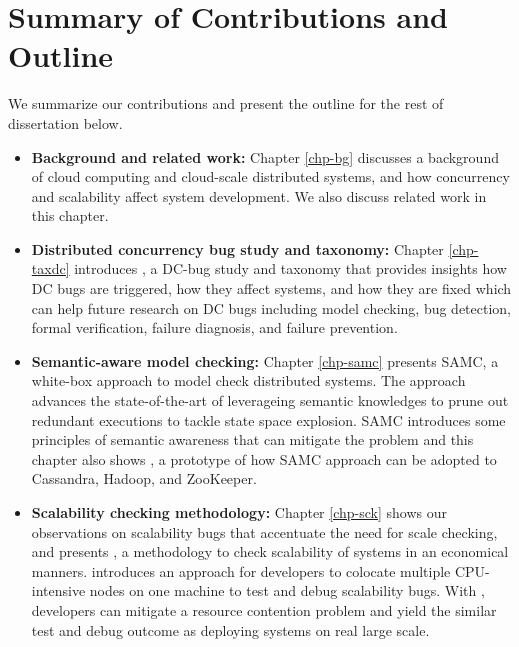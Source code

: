 \section{Summary of Contributions and Outline}

We summarize our contributions and present the outline for the rest of
dissertation below.

\begin{itemize}

\item \textbf{Background and related work:} Chapter \ref{chp-bg} discusses a
background of cloud computing and cloud-scale distributed systems, and how
concurrency and scalability affect system development. We also discuss related
work in this chapter.

\item \textbf{Distributed concurrency bug study and taxonomy:} Chapter
\ref{chp-taxdc} introduces \taxdc, a DC-bug study and taxonomy that provides
insights how DC bugs are triggered, how they affect systems, and how they are
fixed which can help future research on DC bugs including model checking, bug
detection, formal verification, failure diagnosis, and failure prevention.

\item \textbf{Semantic-aware model checking:} Chapter \ref{chp-samc} presents
SAMC, a white-box approach to model check distributed systems. The approach
advances the state-of-the-art of leverageing semantic knowledges to prune out
redundant executions to tackle state space explosion. SAMC introduces some
principles of semantic awareness that can mitigate the problem and this chapter
also shows \sampro, a prototype of how SAMC approach can be adopted to
Cassandra, Hadoop, and ZooKeeper.


\item \textbf{Scalability checking methodology:} Chapter \ref{chp-sck} shows our
observations on scalability bugs that accentuate the need for scale checking,
and presents \sck, a methodology to check scalability of systems in an
economical manners. \sck introduces an approach for developers to colocate
multiple CPU-intensive nodes on one machine to test and debug scalability bugs.
With \sck, developers can mitigate a resource contention problem and yield the
similar test and debug outcome as deploying systems on real large scale.


\end{itemize}
